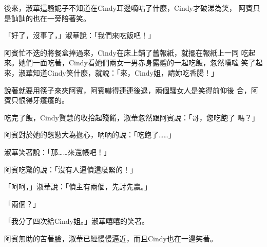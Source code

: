 後來，淑華這騷妮子不知道在Cindy耳邊嘀咕了什麼，Cindy才破涕為笑，
阿賓只是訕訕的也在一旁陪著笑。

「好了，沒事了，」淑華說：「我們來吃飯吧！」

阿賓忙不迭的將餐盒捧過來，Cindy在床上鋪了舊報紙，就擺在報紙上一同
吃起來。她們一面吃著，Cindy看她們兩女一男赤身露體的一起吃飯，忽然噗嗤
笑了起來，淑華知道Cindy笑什麼，就說：「來，Cindy姐，請妳吃香腸！」

說著就要用筷子來夾阿賓，阿賓嚇得連連後退，兩個騷女人是笑得前仰後
合，阿賓只恨得牙癢癢的。

吃完了飯，Cindy賢慧的收拾起殘餚，淑華忽然跟阿賓說：「哥，您吃飽了
嗎？」

阿賓對於她的慇懃大為擔心，吶吶的說：「吃飽了……」

淑華笑著說：「那……來還帳吧！」

阿賓吃驚的說：「沒有人逼債這麼緊的！」

「呵呵，」淑華說：「債主有兩個，先討先贏。」

「兩個？」

「我分了四次給Cindy姐。」淑華嘻嘻的笑著。

阿賓無助的苦著臉，淑華已經慢慢逼近，而且Cindy也在一邊笑著。










